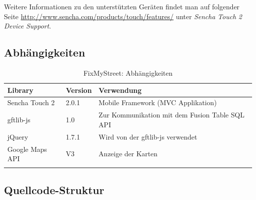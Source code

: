 Weitere Informationen zu den unterstützten Geräten findet man auf folgender Seite \url{http://www.sencha.com/products/touch/features/} unter \emph{Sencha Touch 2 Device Support}.

\subsection{Abhängigkeiten}
\begin{longtable}{|p{0.25\threecelltabwidth}|p{0.1\threecelltabwidth}|p{0.65\threecelltabwidth}|}
\hline 
\textbf{Library} & \textbf{Version} & \textbf{Verwendung} \\ 
\hline 
Sencha Touch 2 & 2.0.1 & Mobile Framework (MVC Applikation) \\ 
\hline 
gftlib-js & 1.0 & Zur Kommunikation mit dem Fusion Table SQL API \\ 
\hline 
jQuery & 1.7.1 & Wird von der gftlib-js verwendet \\ 
\hline 
Google Maps API & V3 & Anzeige der Karten \\ 
\hline 
\caption{FixMyStreet: Abhängigkeiten}
\end{longtable} 

\subsection{Quellcode-Struktur}

